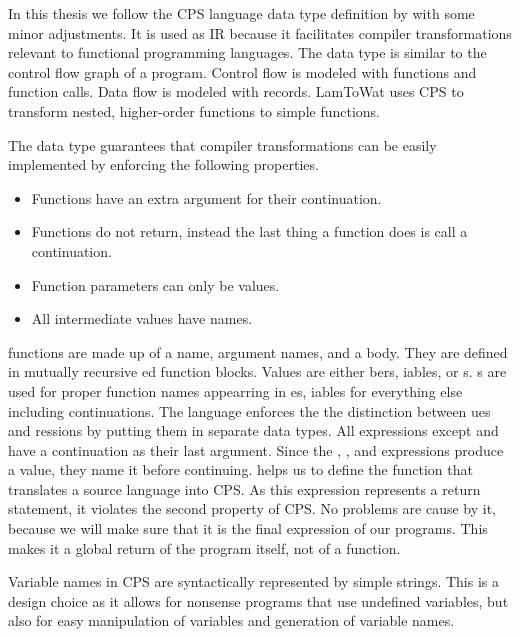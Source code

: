 In this thesis we follow the \ac{CPS} language data type definition by \citeauthor{DBLP:books/daglib/0022396} with some minor adjustments. It is used as \ac{IR} because it facilitates compiler transformations relevant to functional programming languages. The data type is similar to the control flow graph of a program. Control flow is modeled with functions and function calls. Data flow is modeled with records. LamToWat uses \ac{CPS} to transform nested, higher-order functions to simple functions.

The  data type guarantees that compiler transformations can be easily implemented by enforcing the following properties.

\begin{itemize}
\item Functions have an extra argument for their continuation.
\item Functions do not return, instead the last thing a function does is call a continuation.
\item Function parameters can only be values.
\item All intermediate values have names.
\end{itemize}

 functions are made up of a name, argument names, and a body. They are defined in mutually recursive ed function blocks. Values are either bers, iables, or s. s are used for proper function names appearring in es, iables for everything else including continuations. The  language enforces the the distinction between ues and ressions by putting them in separate data types. All expressions except  and  have a continuation as their last argument. Since the , , and  expressions produce a value, they name it before continuing.  helps us to define the function that translates a source language into \ac{CPS}. As this expression represents a return statement, it violates the second property of \ac{CPS}. No problems are cause by it, because we will make sure that it is the final expression of our programs. This makes it a global return of the program itself, not of a function.

Variable names in \ac{CPS} are syntactically represented by simple strings. This is a design choice as it allows for nonsense programs that use undefined variables, but also for easy manipulation of variables and generation of variable names.

